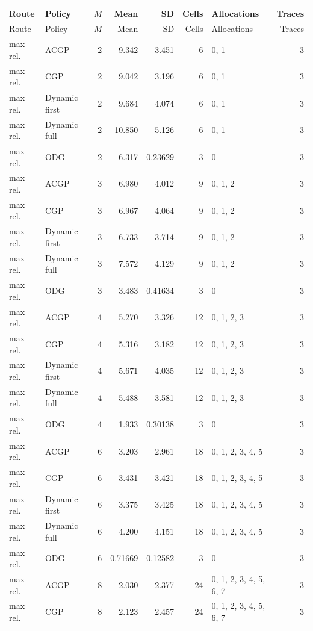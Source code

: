 \documentclass[10pt,a4paper]{article}
\begin{document}
\tiny\setlength{\tabcolsep}{2pt}\begin{longtable}{@{}p{23mm}p{29mm}rrrrp{36mm}r@{}}
\toprule Route & Policy & $M$ & Mean & SD & Cells & Allocations & Traces \\ \midrule\endfirsthead
\toprule Route & Policy & $M$ & Mean & SD & Cells & Allocations & Traces \\ \midrule\endhead
\bottomrule\endfoot
max rel. & ACGP & 2 & 9.342 & 3.451 & 6 & 0, 1 & 3 \\
max rel. & CGP & 2 & 9.042 & 3.196 & 6 & 0, 1 & 3 \\
max rel. & Dynamic first & 2 & 9.684 & 4.074 & 6 & 0, 1 & 3 \\
max rel. & Dynamic full & 2 & 10.850 & 5.126 & 6 & 0, 1 & 3 \\
max rel. & ODG & 2 & 6.317 & 0.23629 & 3 & 0 & 3 \\
max rel. & ACGP & 3 & 6.980 & 4.012 & 9 & 0, 1, 2 & 3 \\
max rel. & CGP & 3 & 6.967 & 4.064 & 9 & 0, 1, 2 & 3 \\
max rel. & Dynamic first & 3 & 6.733 & 3.714 & 9 & 0, 1, 2 & 3 \\
max rel. & Dynamic full & 3 & 7.572 & 4.129 & 9 & 0, 1, 2 & 3 \\
max rel. & ODG & 3 & 3.483 & 0.41634 & 3 & 0 & 3 \\
max rel. & ACGP & 4 & 5.270 & 3.326 & 12 & 0, 1, 2, 3 & 3 \\
max rel. & CGP & 4 & 5.316 & 3.182 & 12 & 0, 1, 2, 3 & 3 \\
max rel. & Dynamic first & 4 & 5.671 & 4.035 & 12 & 0, 1, 2, 3 & 3 \\
max rel. & Dynamic full & 4 & 5.488 & 3.581 & 12 & 0, 1, 2, 3 & 3 \\
max rel. & ODG & 4 & 1.933 & 0.30138 & 3 & 0 & 3 \\
max rel. & ACGP & 6 & 3.203 & 2.961 & 18 & 0, 1, 2, 3, 4, 5 & 3 \\
max rel. & CGP & 6 & 3.431 & 3.421 & 18 & 0, 1, 2, 3, 4, 5 & 3 \\
max rel. & Dynamic first & 6 & 3.375 & 3.425 & 18 & 0, 1, 2, 3, 4, 5 & 3 \\
max rel. & Dynamic full & 6 & 4.200 & 4.151 & 18 & 0, 1, 2, 3, 4, 5 & 3 \\
max rel. & ODG & 6 & 0.71669 & 0.12582 & 3 & 0 & 3 \\
max rel. & ACGP & 8 & 2.030 & 2.377 & 24 & 0, 1, 2, 3, 4, 5, 6, 7 & 3 \\
max rel. & CGP & 8 & 2.123 & 2.457 & 24 & 0, 1, 2, 3, 4, 5, 6, 7 & 3 \\

\end{longtable}
\end{document}
